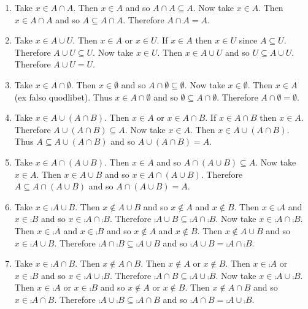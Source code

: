 \documentclass[12pt]{book}
\begin{document}
\begin{enumerate}
\renewcommand{\labelenumi}{\arabic{enumi}'.}
\setcounter{enumi}{9}
\item Take $x \in A \cap A$. Then $x \in A$ and so $A \cap A \subseteq A$. Now take $x \in A$. Then $x \in A \cap A$ and so $A \subseteq A \cap A$. Therefore $A \cap A = A$.
\renewcommand{\labelenumi}{\arabic{enumi}.}
\setcounter{enumi}{10}
\item Take $x \in A \cup U$. Then $x \in A$ or $x \in U$. If $x \in A$ then $x \in U$ since $A \subseteq U$. Therefore $A \cup U \subseteq U$. Now take $x \in U$. Then $x \in A \cup U$ and so $U \subseteq A \cup U$. Therefore $A \cup U = U$.
\renewcommand{\labelenumi}{\arabic{enumi}'.}
\setcounter{enumi}{10}
\item Take $x \in A \cap \emptyset$. Then $x \in \emptyset$ and so $A \cap \emptyset \subseteq \emptyset$. Now take $x \in \emptyset$. Then $x \in A$ (ex falso quodlibet). Thus $x \in A \cap \emptyset$ and so $\emptyset \subseteq A \cap \emptyset$. Therefore $A \cap \emptyset = \emptyset$.
\renewcommand{\labelenumi}{\arabic{enumi}.}
\setcounter{enumi}{11}
\item Take $x \in A \cup (A \cap B)$. Then $x \in A$ or $x \in A \cap B$. If $x \in A \cap B$ then $x \in A$. Therefore $A \cup (A \cap B) \subseteq A$. Now take $x \in A$. Then $x \in A \cup (A \cap B)$. Thus $A \subseteq A \cup (A \cap B)$ and so $A \cup (A \cap B) = A$.
\renewcommand{\labelenumi}{\arabic{enumi}'.}
\setcounter{enumi}{11}
\item Take $x \in A \cap (A \cup B)$. Then $x \in A$ and so $A \cap (A \cup B) \subseteq A$. Now take $x \in A$. Then $x \in A \cup B$ and so $x \in A \cap (A \cup B)$. Therefore $A \subseteq A \cap (A \cup B)$ and so $A \cap (A \cup B) = A$.
\renewcommand{\labelenumi}{\arabic{enumi}.}
\setcounter{enumi}{12}
\item Take $x \in \comp{A \cup B}$. Then $x \notin A \cup B$ and so $x \notin A$ and $x \notin B$. Then $x \in \comp{A}$ and $x \in \comp{B}$ and so $x \in \comp{A} \cap \comp{B}$. Therefore $\comp{A \cup B} \subseteq \comp{A} \cap \comp{B}$. Now take $x \in \comp{A} \cap \comp{B}$. Then $x \in \comp{A}$ and $x \in \comp{B}$ and so $x \notin A$ and $x \notin B$. Then $x \notin A \cup B$ and so $x \in \comp{A \cup B}$. Therefore $\comp{A} \cap \comp{B} \subseteq \comp{A \cup B}$ and so $\comp{A \cup B} = \comp{A} \cap \comp{B}$.
\renewcommand{\labelenumi}{\arabic{enumi}'.}
\setcounter{enumi}{12}
\item Take $x \in \comp{A \cap B}$. Then $x \notin A \cap B$. Then $x \notin A$ or $x \notin B$. Then $x \in \comp{A}$ or $x \in \comp{B}$ and so $x \in \comp{A} \cup \comp{B}$. Therefore $\comp{A \cap B} \subseteq \comp{A} \cup \comp{B}$. Now take $x \in \comp{A} \cup \comp{B}$. Then $x \in \comp{A}$ or $x \in \comp{B}$ and so $x \notin A$ or $x \notin B$. Then $x \notin A \cap B$ and so $x \in \comp{A \cap B}$. Therefore $\comp{A} \cup \comp{B} \subseteq \comp{A \cap B}$ and so $\comp{A \cap B} = \comp{A} \cup \comp{B}$.
\end{enumerate}
\end{document}
